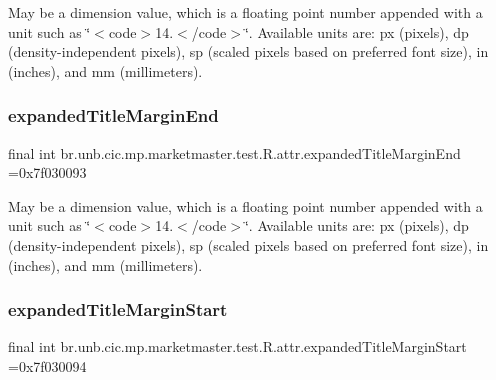 May be a dimension value, which is a floating point number appended with a unit such as \char`\"{}$<$code$>$14.\+5sp$<$/code$>$\char`\"{}. Available units are\+: px (pixels), dp (density-\/independent pixels), sp (scaled pixels based on preferred font size), in (inches), and mm (millimeters). \mbox{\label{classbr_1_1unb_1_1cic_1_1mp_1_1marketmaster_1_1test_1_1R_1_1attr_a898cd44dc665c3f058171105143b2749}} 
\subsubsection{\texorpdfstring{expanded\+Title\+Margin\+End}{expandedTitleMarginEnd}}
{\footnotesize\ttfamily final int br.\+unb.\+cic.\+mp.\+marketmaster.\+test.\+R.\+attr.\+expanded\+Title\+Margin\+End =0x7f030093\hspace{0.3cm}{\ttfamily [static]}}

May be a dimension value, which is a floating point number appended with a unit such as \char`\"{}$<$code$>$14.\+5sp$<$/code$>$\char`\"{}. Available units are\+: px (pixels), dp (density-\/independent pixels), sp (scaled pixels based on preferred font size), in (inches), and mm (millimeters). \mbox{\label{classbr_1_1unb_1_1cic_1_1mp_1_1marketmaster_1_1test_1_1R_1_1attr_adc05df5652e5c2bae4b2787919992427}} 
\subsubsection{\texorpdfstring{expanded\+Title\+Margin\+Start}{expandedTitleMarginStart}}
{\footnotesize\ttfamily final int br.\+unb.\+cic.\+mp.\+marketmaster.\+test.\+R.\+attr.\+expanded\+Title\+Margin\+Start =0x7f030094\hspace{0.3cm}{\ttfamily [static]}}

